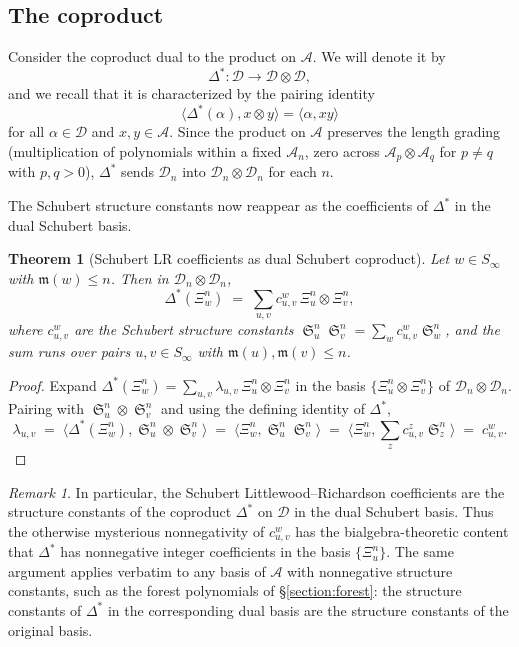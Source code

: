 \documentclass{amsart}
\newtheorem{theorem}{Theorem}[section]
\theoremstyle{definition}
\theoremstyle{remark}
\newtheorem*{remark}{Remark}
\numberwithin{equation}{subsection}
\DeclareMathOperator{\sch}{\mathfrak{S}}
\newcommand{\dsch}{\ensuremath{\Xi}}
\newcommand{\coma}{\mathcal{A}}
\newcommand{\dcoma}{\mathcal{D}}
\newcommand{\maxd}{\mathfrak{m}}
\begin{document}
\subsection{The coproduct}

Consider the coproduct dual to the product on $\coma$. We will denote it by
$$\Delta^*:\dcoma\to \dcoma\otimes\dcoma,$$
and we recall that it is characterized by the pairing identity
$$\langle \Delta^*(\alpha), x\otimes y\rangle = \langle \alpha, xy\rangle$$
for all $\alpha\in\dcoma$ and $x,y\in\coma$. Since the product on $\coma$ preserves the length grading (multiplication of polynomials within a fixed $\coma_n$, zero across $\coma_p\otimes\coma_q$ for $p\neq q$ with $p,q>0$), $\Delta^*$ sends $\dcoma_n$ into $\dcoma_n\otimes\dcoma_n$ for each $n$.

The Schubert structure constants now reappear as the coefficients of $\Delta^*$ in the dual Schubert basis.

\begin{theorem}[Schubert LR coefficients as dual Schubert coproduct]\label{theorem:dschcoproduct}
Let $w\in S_\infty$ with $\maxd(w)\leq n$. Then in $\dcoma_n\otimes\dcoma_n$,
$$\Delta^*(\dsch_w^n) \;=\; \sum_{u,v} c_{u,v}^w\, \dsch_u^n\otimes \dsch_v^n,$$
where $c_{u,v}^w$ are the Schubert structure constants $\sch_u^n\sch_v^n=\sum_w c_{u,v}^w\sch_w^n$, and the sum runs over pairs $u,v\in S_\infty$ with $\maxd(u),\maxd(v)\leq n$.
\end{theorem}
\begin{proof}
Expand $\Delta^*(\dsch_w^n) = \sum_{u,v}\lambda_{u,v}\,\dsch_u^n\otimes\dsch_v^n$ in the basis $\{\dsch_u^n\otimes\dsch_v^n\}$ of $\dcoma_n\otimes\dcoma_n$. Pairing with $\sch_u^n\otimes\sch_v^n$ and using the defining identity of $\Delta^*$,
$$\lambda_{u,v}\;=\;\langle \Delta^*(\dsch_w^n), \sch_u^n\otimes\sch_v^n\rangle\;=\;\langle \dsch_w^n,\sch_u^n\sch_v^n\rangle\;=\;\langle \dsch_w^n,\textstyle\sum_z c_{u,v}^z \sch_z^n\rangle\;=\;c_{u,v}^w.$$
\end{proof}

\begin{remark}
In particular, the Schubert Littlewood--Richardson coefficients are the structure constants of the coproduct $\Delta^*$ on $\dcoma$ in the dual Schubert basis. Thus the otherwise mysterious nonnegativity of $c_{u,v}^w$ has the bialgebra-theoretic content that $\Delta^*$ has nonnegative integer coefficients in the basis $\{\dsch_u^n\}$. The same argument applies verbatim to any basis of $\coma$ with nonnegative structure constants, such as the forest polynomials of \S\ref{section:forest}: the structure constants of $\Delta^*$ in the corresponding dual basis are the structure constants of the original basis.
\end{remark}
\end{document}
